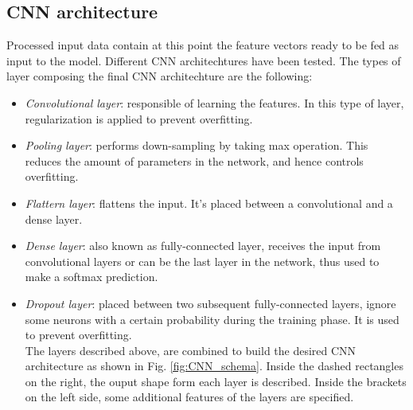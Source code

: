 \subsection*{\textbf {CNN architecture}}
\label{subsec:arch}
\noindent Processed input data contain at this point the feature vectors ready to be fed as input to the model. Different CNN architechtures have been tested. The types of layer composing the final CNN architechture are the following:
\begin{itemize}
\item {\it{Convolutional layer}}: responsible of learning the features. In this type of layer, regularization is applied to prevent overfitting.
\item {\it{Pooling layer}}: performs down-sampling by taking max operation. This reduces the amount of parameters in the network, and hence controls overfitting.
\item {\it{Flattern layer}}: flattens the input. It's placed between a convolutional and a dense layer.
\item {\it{Dense layer}}: also known as fully-connected layer, receives the input from convolutional layers or can be the last layer in the network, thus used to make a softmax prediction.
\item {\it{Dropout layer}}: placed between two subsequent fully-connected layers, ignore some neurons with a certain probability during the training phase. It is used to prevent overfitting.\\


\noindent The layers described above, are combined to build the desired CNN architecture as shown in Fig. \ref{fig:CNN_schema}.  Inside the dashed rectangles on the right, the ouput shape form each layer is described. Inside the brackets on the left side, some additional features of the layers are specified.

\end{itemize}
